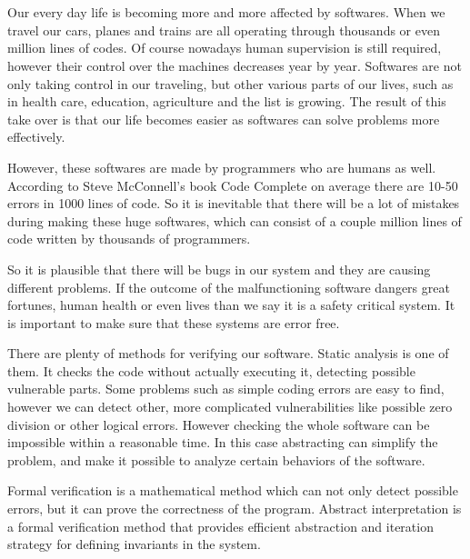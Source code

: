 \chapter{\bevezetes}
\label{sec:intro}

Our every day life is becoming more and more affected by softwares. When we travel our cars, planes and trains are all operating through thousands or even million lines of codes. Of course nowadays human supervision is still required, however their control over the machines decreases year by year. Softwares are not only taking control in our traveling, but other various parts of our lives, such as in health care, education, agriculture and the list is growing. The result of this take over is that our life becomes easier as softwares can solve problems more effectively.

However, these softwares are made by programmers who are humans as well. According to Steve McConnell's book Code Complete on average there are 10-50 errors in 1000 lines of code. So it is inevitable that there will be a lot of mistakes during making these huge softwares, which can consist of a couple million lines of code written by thousands of programmers.

So it is plausible that there will be bugs in our system and they are causing different problems. If the outcome of the malfunctioning software dangers great fortunes, human health or even lives than we say it is a safety critical system. It is important to make sure that these systems are error free.

There are plenty of methods for verifying our software. Static analysis is one of them. It checks the code without actually executing it, detecting possible vulnerable parts. Some problems such as simple coding errors are easy to find, however we can detect other, more complicated vulnerabilities like possible zero division or other logical errors. However checking the whole software can be impossible within a reasonable time. In this case abstracting can simplify the problem, and make it possible to analyze certain behaviors of the software.

Formal verification is a mathematical method which can not only detect possible errors, but it can prove the correctness of the program. Abstract interpretation is a formal verification method that provides efficient abstraction and iteration strategy for defining invariants in the system.

